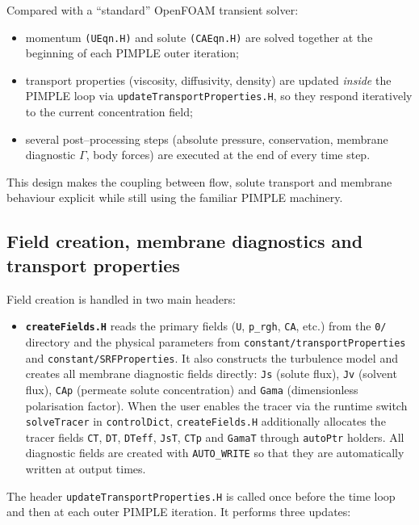 \documentclass[11pt,a4paper]{article}
\begin{document}
Compared with a ``standard'' OpenFOAM transient solver:

\begin{itemize}
	\item momentum \texttt{(UEqn.H)} and solute \texttt{(CAEqn.H)} are
	solved together at the beginning of each PIMPLE outer iteration;
	\item transport properties (viscosity, diffusivity, density) are
	updated \emph{inside} the PIMPLE loop via
	\texttt{updateTransportProperties.H}, so they respond
	iteratively to the current concentration field;
	\item several post--processing steps (absolute pressure, conservation,
	membrane diagnostic \(\Gamma\), body forces) are executed at the
	end of every time step.
\end{itemize}

This design makes the coupling between flow, solute transport and
membrane behaviour explicit while still using the familiar PIMPLE
machinery.

\subsection{Field creation, membrane diagnostics and transport properties}

Field creation is handled in two main headers:

\begin{itemize}
	\item \textbf{\texttt{createFields.H}} reads the primary fields
	(\texttt{U}, \texttt{p\_rgh}, \texttt{CA}, etc.) from the
	\texttt{0/} directory and the physical parameters from
	\texttt{constant/transportProperties} and
	\texttt{constant/SRFProperties}. It also constructs the
	turbulence model and creates all membrane diagnostic fields
	directly: \texttt{Js} (solute flux), \texttt{Jv} (solvent flux),
	\texttt{CAp} (permeate solute concentration) and \texttt{Gama}
	(dimensionless polarisation factor). When the user enables the
	tracer via the runtime switch \texttt{solveTracer} in
	\texttt{controlDict}, \texttt{createFields.H} additionally
	allocates the tracer fields \texttt{CT}, \texttt{DT},
	\texttt{DTeff}, \texttt{JsT}, \texttt{CTp} and \texttt{GamaT}
	through \texttt{autoPtr} holders. All diagnostic fields are
	created with \texttt{AUTO\_WRITE} so that they are automatically
	written at output times.
\end{itemize}

The header \texttt{updateTransportProperties.H} is called once before
the time loop and then at each outer PIMPLE iteration. It performs three
updates:
\end{document}
